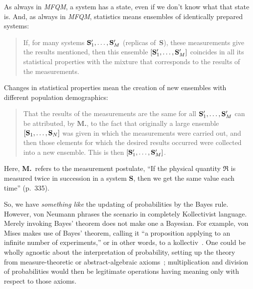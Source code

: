 \documentclass[aps,pra,superscriptaddress,12pt,tightenlines,nofootinbib]{revtex4}
\newcommand{\MFQM}{\textsl{MFQM}}
\begin{document}
As always in \MFQM, a system has a state, even if we don't know what
that state is.  And, as always in \MFQM, statistics means ensembles of
identically prepared systems:
\begin{quotation}
\noindent If, for many systems ${\bf S}'_1,\ldots,{\bf S}'_M$
(replicas of~{\bf S}), these measurements give the results mentioned,
then this ensemble $[{\bf S}'_1,\ldots,{\bf S}'_M]$ coincides in all
its statistical properties with the mixture that corresponds to the
results of the measurements.
\end{quotation}
Changes in statistical properties mean the creation of new ensembles
with different population demographics:
\begin{quotation}
That the results of the measurements are the same for all ${\bf
  S}'_1,\ldots,{\bf S}'_M$ can be attributed, by {\bf M.}, to the fact
that originally a large ensemble $[{\bf S}_1,\ldots,{\bf S}_N]$ was
given in which the measurements were carried out, and then those
elements for which the desired results occurred were collected into a
new ensemble.  This is then $[{\bf S}'_1,\ldots,{\bf S}'_M]$.
\end{quotation}
Here, {\bf M.}\ refers to the measurement postulate, ``If the physical
quantity $\mathfrak{R}$ is measured twice in succession in a system
{\bf S}, then we get the same value each time'' (p.\ 335).

So, we have \emph{something like} the updating of probabilities by the
Bayes rule.  However, von Neumann phrases the scenario in completely
Kollectivist language.  Merely invoking Bayes' theorem does not make
one a Bayesian.  For example, von Mises makes use of Bayes' theorem,
calling it ``a proposition applying to an infinite number of
experiments,'' or in other words, to a
kollectiv~\cite[p.\ 123]{Mises1957}.  One could be wholly agnostic
about the interpretation of probability, setting up the theory from
measure-theoretic or abstract-algebraic axioms~\cite{Tao2012};
multiplication and division of probabilities would then be legitimate
operations having meaning only with respect to those axioms.
\end{document}
